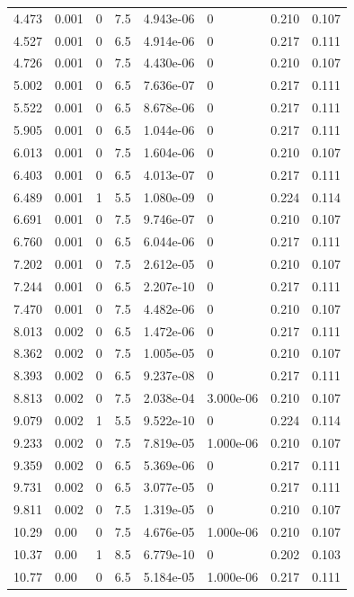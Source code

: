 \documentclass[preview]{standalone}
\begin{document}
{{\begin{tabular}{L{1.2cm}C{1.2cm} C{0.3cm}C{0.5cm} C{1.4cm}C{1.4cm} C{1.4cm}C{1.4cm}}
  4.473  &  0.001  & 0     & 7.5 &  4.943e-06  & 0  & 0.210 &  0.107   \\ 
  4.527  &  0.001  & 0     & 6.5 &  4.914e-06  & 0  & 0.217 &  0.111   \\ 
  4.726  &  0.001  & 0     & 7.5 &  4.430e-06  & 0  & 0.210 &  0.107   \\ 
  5.002  &  0.001  & 0     & 6.5 &  7.636e-07  & 0  & 0.217 &  0.111   \\ 
  5.522  &  0.001  & 0     & 6.5 &  8.678e-06  & 0  & 0.217 &  0.111   \\ 
  5.905  &  0.001  & 0     & 6.5 &  1.044e-06  & 0  & 0.217 &  0.111   \\ 
  6.013  &  0.001  & 0     & 7.5 &  1.604e-06  & 0  & 0.210 &  0.107   \\ 
  6.403  &  0.001  & 0     & 6.5 &  4.013e-07  & 0  & 0.217 &  0.111   \\ 
  6.489  &  0.001  & 1     & 5.5 &  1.080e-09  & 0  & 0.224 &  0.114   \\ 
  6.691  &  0.001  & 0     & 7.5 &  9.746e-07  & 0  & 0.210 &  0.107   \\ 
  6.760  &  0.001  & 0     & 6.5 &  6.044e-06  & 0  & 0.217 &  0.111   \\ 
  7.202  &  0.001  & 0     & 7.5 &  2.612e-05  & 0  & 0.210 &  0.107   \\ 
  7.244  &  0.001  & 0     & 6.5 &  2.207e-10  & 0  & 0.217 &  0.111   \\ 
  7.470  &  0.001  & 0     & 7.5 &  4.482e-06  & 0  & 0.210 &  0.107   \\ 
  8.013  &  0.002  & 0     & 6.5 &  1.472e-06  & 0  & 0.217 &  0.111   \\ 
  8.362  &  0.002  & 0     & 7.5 &  1.005e-05  & 0  & 0.210 &  0.107   \\ 
  8.393  &  0.002  & 0     & 6.5 &  9.237e-08  & 0  & 0.217 &  0.111   \\ 
  8.813  &  0.002  & 0     & 7.5 &  2.038e-04  & 3.000e-06  & 0.210 &  0.107   \\ 
  9.079  &  0.002  & 1     & 5.5 &  9.522e-10  & 0  & 0.224 &  0.114   \\ 
  9.233  &  0.002  & 0     & 7.5 &  7.819e-05  & 1.000e-06  & 0.210 &  0.107   \\ 
  9.359  &  0.002  & 0     & 6.5 &  5.369e-06  & 0  & 0.217 &  0.111   \\ 
  9.731  &  0.002  & 0     & 6.5 &  3.077e-05  & 0  & 0.217 &  0.111   \\ 
  9.811  &  0.002  & 0     & 7.5 &  1.319e-05  & 0  & 0.210 &  0.107   \\ 
  10.29  &  0.00  & 0     & 7.5 &  4.676e-05  & 1.000e-06  & 0.210 &  0.107   \\ 
  10.37  &  0.00  & 1     & 8.5 &  6.779e-10  & 0  & 0.202 &  0.103   \\ 
  10.77  &  0.00  & 0     & 6.5 &  5.184e-05  & 1.000e-06  & 0.217 &  0.111   \\ 
\hline 
\end{tabular} 

}}
\end{document}
